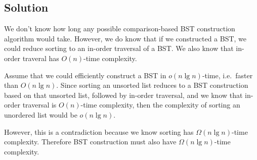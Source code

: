 \subsection*{Solution}

We don't know how long any possible comparison-based BST construction algorithm would take. However, we do know that if we constructed a BST, we could reduce sorting to an in-order traversal of a BST. We also know that in-order traveral has $O(n)$-time complexity. 

Assume that we could efficiently construct a BST in $o(n \lg n)$-time, i.e.\ faster than $O(n \lg n)$. Since sorting an unsorted list reduces to a BST construction based on that unsorted list, followed by in-order traversal, and we know that in-order traversal is $O(n)$-time complexity, then the complexity of sorting an unordered list would be $o(n \lg n)$. 

However, this is a contradiction because we know sorting has $\Omega(n \lg n)$-time complexity. Therefore BST construction must also have $\Omega(n \lg n)$-time complexity.
